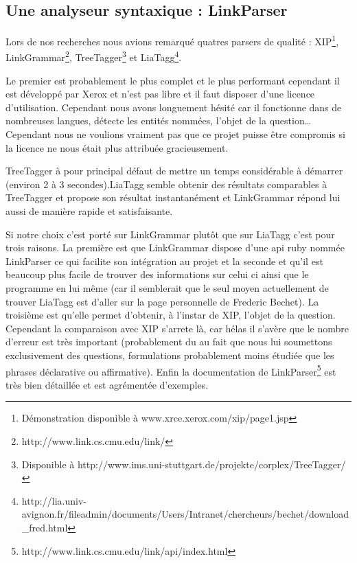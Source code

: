 \documentclass[10pt,a4paper]{article}
\begin{document}
\subsection{Une analyseur syntaxique : LinkParser}
\par Lors de nos recherches nous avions remarqué quatres parsers de qualité : XIP\footnote{Démonstration disponible à www.xrce.xerox.com/xip/page1.jsp}, LinkGrammar\footnote{http://www.link.cs.cmu.edu/link/}, TreeTagger\footnote{Disponible à http://www.ims.uni-stuttgart.de/projekte/corplex/TreeTagger/} et LiaTagg\footnote{http://lia.univ-avignon.fr/fileadmin/documents/Users/Intranet/chercheurs/bechet/download\_fred.html}.
\par Le premier est probablement le plus complet et le plus performant cependant il est développé par Xerox et n'est pas libre et il faut disposer d'une licence d'utilisation. Cependant nous avons longuement hésité car il fonctionne dans de nombreuses langues, détecte les entités nommées, l'objet de la question\ldots Cependant nous ne voulions vraiment pas que ce projet puisse être compromis si la licence ne nous était plus attribuée gracieusement.
\par TreeTagger à pour principal défaut de mettre un temps considérable à démarrer (environ 2 à 3 secondes).LiaTagg semble obtenir des résultats comparables à TreeTagger et propose son résultat instantanément et LinkGrammar répond lui aussi de manière rapide et satisfaisante.
\par Si notre choix c'est porté sur LinkGrammar plutôt que sur LiaTagg c'est pour trois raisons. La première est que LinkGrammar dispose d'une api ruby nommée LinkParser ce qui facilite son intégration au projet et la seconde et qu'il est beaucoup plus facile de trouver des informations sur celui ci ainsi que le programme en lui même (car il semblerait que le seul moyen actuellement de trouver LiaTagg est d'aller sur la page personnelle de Frederic Bechet). La troisième est qu'elle permet d'obtenir, à l'instar de XIP, l'objet de la question. Cependant la comparaison avec XIP s'arrete là, car hélas il s'avère que le nombre d'erreur est très important (probablement du au fait que nous lui soumettons exclusivement des questions, formulations probablement moins étudiée que les phrases déclarative ou affirmative). Enfin la documentation de LinkParser\footnote{http://www.link.cs.cmu.edu/link/api/index.html} est très bien détaillée et est agrémentée d'exemples.
\end{document}
